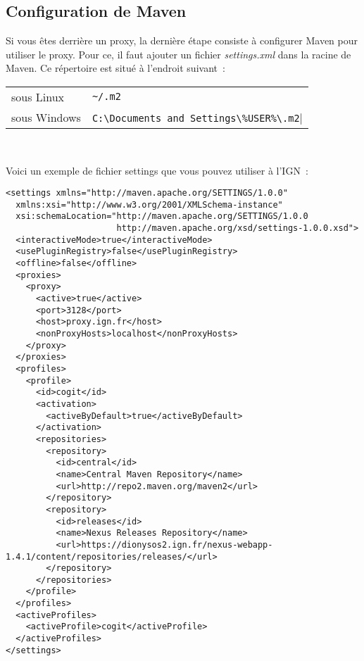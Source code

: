 \subsection{Configuration de Maven}
Si vous \^etes derrière un proxy, la dernière étape consiste à configurer Maven pour utiliser le proxy. Pour ce, il faut ajouter un fichier \emph{settings.xml} dans la racine de Maven. Ce répertoire est situé à l'endroit suivant~:\\

\smallskip 

\begin{tabular}[!t]{ll}
sous Linux&\verb|~/.m2|\\
sous Windows&\verb|C:\Documents and Settings\%USER%\.m2|
\end{tabular}\\

\bigskip 

\noindent
Voici un exemple de fichier settings que vous pouvez utiliser à l'IGN~:
\begin{scriptsize}
\begin{verbatim}
<settings xmlns="http://maven.apache.org/SETTINGS/1.0.0"
  xmlns:xsi="http://www.w3.org/2001/XMLSchema-instance"
  xsi:schemaLocation="http://maven.apache.org/SETTINGS/1.0.0
                      http://maven.apache.org/xsd/settings-1.0.0.xsd">
  <interactiveMode>true</interactiveMode>
  <usePluginRegistry>false</usePluginRegistry>
  <offline>false</offline>
  <proxies>
    <proxy>
      <active>true</active>
      <port>3128</port>
      <host>proxy.ign.fr</host>
      <nonProxyHosts>localhost</nonProxyHosts>
    </proxy>
  </proxies>
  <profiles>
    <profile>
      <id>cogit</id>
      <activation>
        <activeByDefault>true</activeByDefault>
      </activation>
      <repositories>
        <repository>
          <id>central</id>
          <name>Central Maven Repository</name>
          <url>http://repo2.maven.org/maven2</url>
        </repository>
        <repository>
          <id>releases</id>
          <name>Nexus Releases Repository</name>
          <url>https://dionysos2.ign.fr/nexus-webapp-1.4.1/content/repositories/releases/</url>
        </repository>
      </repositories>
    </profile>
  </profiles>
  <activeProfiles>
    <activeProfile>cogit</activeProfile>
  </activeProfiles>
</settings>
\end{verbatim}
\end{scriptsize}




